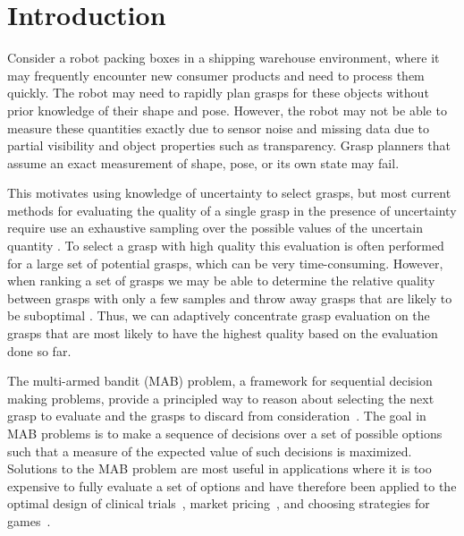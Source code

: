 \documentclass[letterpaper, 10 pt, conference]{ieeeconf}  %
\begin{document}
\section{Introduction}


Consider a robot packing boxes in a shipping warehouse environment, where it may frequently encounter new consumer products and need to process them quickly.
The robot may need to rapidly plan grasps for these objects without prior knowledge of their shape and pose.
However, the robot may not be able to measure these quantities exactly due to sensor noise and missing data due to partial visibility and object properties such as transparency.
Grasp planners that assume an exact measurement of shape, pose, or its own state may fail.

This motivates using knowledge of uncertainty to select grasps, but most current methods for evaluating the quality of a single grasp in the presence of uncertainty require use an exhaustive sampling over the possible values of the uncertain quantity \cite{kehoe2012toward, kim2012physically, weisz2012pose}.
To select a grasp with high quality this evaluation is often performed for a large set of potential grasps, which can be very time-consuming.
However, when ranking a set of grasps we may be able to determine the relative quality between grasps with only a few samples and throw away grasps that are likely to be suboptimal \cite{kehoe2012estimating}.
Thus, we can adaptively concentrate grasp evaluation on the grasps that are most likely to have the highest quality based on the evaluation done so far.

The multi-armed bandit (MAB) problem, a framework for sequential decision making problems, provide a principled way to reason about selecting the next grasp to evaluate and the grasps to discard from consideration~\cite{barto1998reinforcement, lai1985asymptotically, robbins1985some}.
The goal in MAB problems is to make a sequence of decisions over a set of possible options such that a measure of the expected value of such decisions is maximized.
Solutions to the MAB problem are most useful in applications where it is too expensive to fully evaluate a set of options and have therefore been applied to the optimal design of clinical trials~\cite{simon1989optimal}, market pricing~\cite{rothschild1974two}, and choosing strategies for games~\cite{st2012online}.
\end{document}
